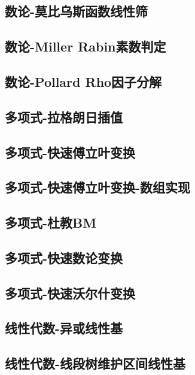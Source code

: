 \documentclass[UTF8]{ctexart}
\begin{document}
\begin{CJK}{UTF8}{<font>}
\begin{spacing}{0.80}
\subsection{数论-莫比乌斯函数线性筛} 
\subsection{数论-Miller Rabin素数判定} 
\subsection{数论-Pollard Rho因子分解} 
\subsection{多项式-拉格朗日插值} 
\subsection{多项式-快速傅立叶变换} 
\subsection{多项式-快速傅立叶变换-数组实现} 
\subsection{多项式-杜教BM} 
\subsection{多项式-快速数论变换} 
\subsection{多项式-快速沃尔什变换} 
\subsection{线性代数-异或线性基} 
\subsection{线性代数-线段树维护区间线性基} 

\end{spacing}
\end{CJK}
\end{document}

